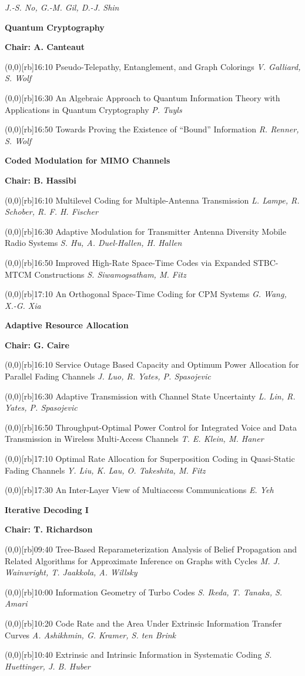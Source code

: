 \documentclass[a5paper,twoside]{article}
\def\period#1{\flushleft{\large\bfseries #1}\markboth{\sf #1}{\sf #1}}
\def\sesstitle#1{\vspace{.45\bigskipamount}\par{\bfseries #1}\par}
\def\sesschair#1{{\bfseries Chair: #1}\par\vspace{.65\medskipamount}}
\def\papertime#1{\makebox(0,0)[rb]{{\scriptsize #1}\hspace{.5em}}}
\def\papertitle#1{#1\hfil\break}
\def\paperauthors#1{{\itshape #1}\par\filbreak\vspace{.65\medskipamount}}
\begin{document}
\paperauthors{J.-S. No, G.-M. Gil, D.-J. Shin}
\sesstitle{Quantum Cryptography}
\sesschair{A. Canteaut}
\papertime{16:10}%
\papertitle{Pseudo-Telepathy, Entanglement, and Graph Colorings}
\paperauthors{V. Galliard, S. Wolf}
\papertime{16:30}%
\papertitle{An Algebraic Approach to Quantum Information Theory with Applications in Quantum Cryptography}
\paperauthors{P. Tuyls}
\papertime{16:50}%
\papertitle{Towards Proving the Existence of ``Bound'' Information}
\paperauthors{R. Renner, S. Wolf}
\sesstitle{Coded Modulation for MIMO Channels}
\sesschair{B. Hassibi}
\papertime{16:10}%
\papertitle{Multilevel Coding for Multiple-Antenna Transmission}
\paperauthors{L. Lampe, R. Schober, R. F. H. Fischer}
\papertime{16:30}%
\papertitle{Adaptive Modulation for Transmitter Antenna Diversity Mobile Radio Systems}
\paperauthors{S. Hu, A. Duel-Hallen, H. Hallen}
\papertime{16:50}%
\papertitle{Improved High-Rate Space-Time Codes via Expanded STBC-MTCM Constructions}
\paperauthors{S. Siwamogsatham, M. Fitz}
\papertime{17:10}%
\papertitle{An Orthogonal Space-Time Coding for CPM Systems}
\paperauthors{G. Wang, X.-G. Xia}
\sesstitle{Adaptive Resource Allocation}
\sesschair{G. Caire}
\papertime{16:10}%
\papertitle{Service Outage Based Capacity and Optimum Power Allocation for Parallel Fading Channels}
\paperauthors{J. Luo, R. Yates, P. Spasojevic}
\papertime{16:30}%
\papertitle{Adaptive Transmission with Channel State Uncertainty}
\paperauthors{L. Lin, R. Yates, P. Spasojevic}
\papertime{16:50}%
\papertitle{Throughput-Optimal Power Control for Integrated Voice and Data Transmission in Wireless Multi-Access Channels}
\paperauthors{T. E. Klein, M. Haner}
\papertime{17:10}%
\papertitle{Optimal Rate Allocation for Superposition Coding in Quasi-Static Fading Channels}
\paperauthors{Y. Liu, K. Lau, O. Takeshita, M. Fitz}
\papertime{17:30}%
\papertitle{An Inter-Layer View of Multiaccess Communications}
\paperauthors{E. Yeh}
\period{Tue 09:40 -- 11:00}
\sesstitle{Iterative Decoding I}
\sesschair{T. Richardson}
\papertime{09:40}%
\papertitle{Tree-Based Reparameterization Analysis of Belief Propagation and Related Algorithms for Approximate Inference on Graphs with Cycles}
\paperauthors{M. J. Wainwright, T. Jaakkola, A. Willsky}
\papertime{10:00}%
\papertitle{Information Geometry of Turbo Codes}
\paperauthors{S. Ikeda, T. Tanaka, S. Amari}
\papertime{10:20}%
\papertitle{Code Rate and the Area Under Extrinsic Information Transfer Curves}
\paperauthors{A. Ashikhmin, G. Kramer, S. ten Brink}
\papertime{10:40}%
\papertitle{Extrinsic and Intrinsic Information in Systematic Coding}
\paperauthors{S. Huettinger, J. B. Huber}
\end{document}
